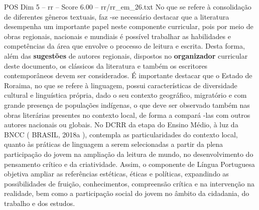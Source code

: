 \begin{textsample}{POS Dim 5 – rr – Score 6.00 – rr/rr\_em\_26.txt}
No que se refere à consolidação de diferentes gêneros textuais, faz -se necessário destacar que a literatura desempenha um importante papel neste componente curricular, pois por meio de obras regionais, nacionais e mundiais é possível trabalhar as habilidades e competências da área que envolve o processo de leitura e escrita.
Desta forma, além das \textbf{sugestões} de autores regionais, dispostos no \textbf{organizador} curricular deste documento, os clássicos da literatura e também os escritores contemporâneos devem ser considerados.
É importante destacar que o Estado de Roraima, no que se refere à linguagem, possui características de diversidade cultural e linguística própria, dado o seu contexto geográfico, migratório e com grande presença de populações indígenas, o que deve ser observado também nas obras literárias presentes no contexto local, de forma a compará -las com outros autores nacionais ou globais.
No DCRR da etapa do Ensino Médio, à luz da BNCC ( BRASIL, 2018a ), contempla as particularidades do contexto local, quanto às práticas de linguagem a serem selecionadas a partir da plena participação do jovem na ampliação da leitura de mundo, no desenvolvimento do pensamento crítico e da criatividade.
Assim, o componente de Língua Portuguesa objetiva ampliar as referências estéticas, éticas e políticas, expandindo as possibilidades de fruição, conhecimentos, compreensão crítica e na intervenção na realidade, bem como a participação social do jovem no âmbito da cidadania, do trabalho e dos estudos.

\end{textsample}
